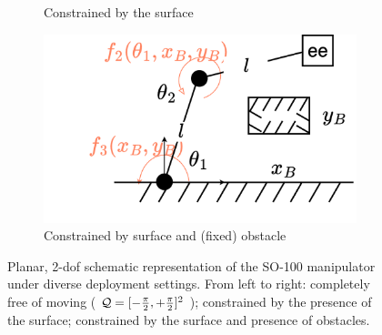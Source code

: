 \begin{figure}
\begin{subfigure}[t]{0.32\linewidth}
        \caption{Constrained by the surface}
        \label{fig:planar-manipulator-floor}
    \end{subfigure}\hfill
    \begin{subfigure}[t]{0.32\linewidth}
        \centering
        \includegraphics[width=\linewidth,height=\panelheight,keepaspectratio]{figures/ch2/ch2-planar-manipulator-floor-shelf.png}
        \caption{Constrained by surface and (fixed) obstacle}
        \label{fig:planar-manipulator-floor-shelf}
    \end{subfigure}
    \caption{Planar, 2-dof schematic representation of the SO-100 manipulator under diverse deployment settings. From left to right: completely free of moving ( \( \mathcal Q = [-\frac{\pi}{2}, +\frac{\pi}{2}]^2 \) ); constrained by the presence of the surface; constrained by the surface and presence of obstacles.}
\end{figure}

